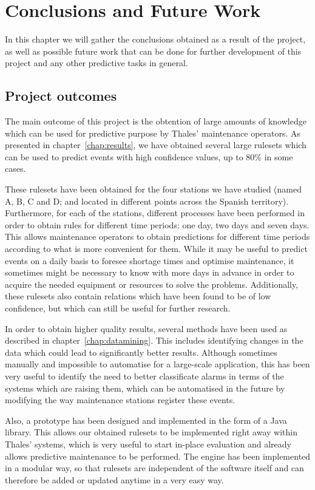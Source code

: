 \chapter{Conclusions and Future Work}
\label{chap:conclusions}
\begin{chapterintro}
In this chapter we will gather the conclusions obtained as a result of the project, as well as possible future work that can be done for further development of this project and any other predictive tasks in general.
\end{chapterintro}
\section{Project outcomes}
The main outcome of this project is the obtention of large amounts of knowledge which can be used for predictive purpose by Thales' maintenance operators. As presented in chapter~\ref{chap:results}, we have obtained several large rulesets which can be used to predict events with high confidence values, up to 80\% in some cases.

These rulesets have been obtained for the four stations we have studied (named A, B, C and D; and located in different points across the Spanish territory). Furthermore, for each of the stations, different processes have been performed in order to obtain rules for different time periods: one day, two days and seven days. This allows maintenance operators to obtain predictions for different time periods according to what is more convenient for them. While it may be useful to predict events on a daily basis to foresee shortage times and optimise maintenance, it sometimes might be necessary to know with more days in advance in order to acquire the needed equipment or resources to solve the problems. Additionally, these rulesets also contain relations which have been found to be of low confidence, but which can still be useful for further research.

In order to obtain higher quality results, several methods have been used as described in chapter~\ref{chap:datamining}. This includes identifying changes in the data which could lead to significantly better results. Although sometimes manually and impossible to automatise for a large-scale application, this has been very useful to identify the need to better classificate alarms in terms of the systems which are raising them, which can be automatised in the future by modifying the way maintenance stations register these events.

Also, a prototype has been designed and implemented in the form of a Java library. This allows our obtained rulesets to be implemented right away within Thales' systems, which is very useful to start in-place evaluation and already allows predictive maintenance to be performed. The engine has been implemented in a modular way, so that rulesets are independent of the software itself and can therefore be added or updated anytime in a very easy way.

